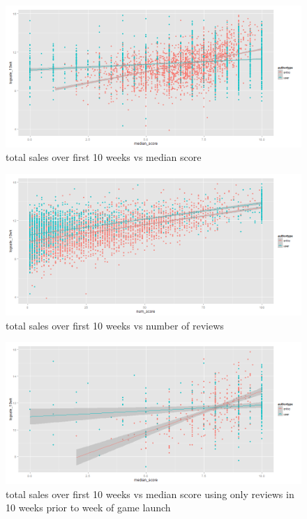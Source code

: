 \documentclass[letterpaper]{article}
\begin{document}
\begin{figure}[tbph]
\centering
\includegraphics[width=\linewidth]{./sales_10wk_vs_medianscore}
\caption{total sales over first 10 weeks vs median score}
\label{fig:sales_10wk_vs_medianscore}
\end{figure}

\begin{figure}[tbph]
\centering
\includegraphics[width=\linewidth]{./sales_10wk_vs_reviewnum}
\caption{total sales over first 10 weeks vs number of reviews}
\label{fig:sales_10wk_vs_reviewnum}
\end{figure}

\begin{figure}[tbph]
\centering
\includegraphics[width=\linewidth]{./sales_10wk_vs_medianscore_pre10}
\caption{total sales over first 10 weeks vs median score using only reviews in 10 weeks prior to week of game launch}
\label{fig:sales_10wk_vs_medianscore_pre10}
\end{figure}
\end{document}
